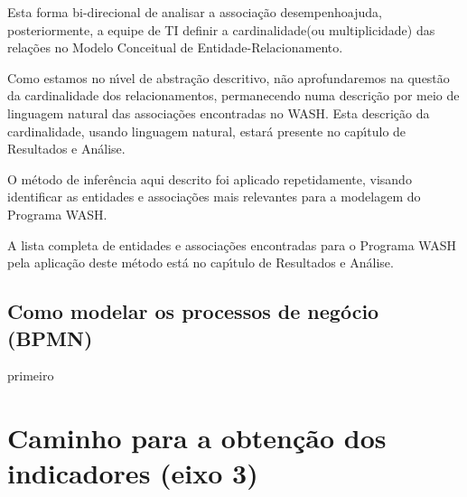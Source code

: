 \documentclass[
12pt,		%
openright,	%
twoside,  %
a4paper,			%
chapter=TITLE,		%
english,			%
french,				%
spanish,			%
brazil				%
]{USPSC-classe/USPSC}
\begin{document}
Esta forma bi-direcional de analisar a associa\c{c}\~ao \textquotedbl desempenho\textquotedbl  ajuda, posteriormente, a equipe de TI definir a \textquotedbl cardinalidade\textquotedbl  (ou multiplicidade) das rela\c{c}\~oes no Modelo Conceitual de Entidade-Relacionamento.









Como estamos no n\'{\i}vel de abstra\c{c}\~ao descritivo, n\~ao aprofundaremos na quest\~ao da cardinalidade dos relacionamentos, permanecendo numa descri\c{c}\~ao por meio de linguagem natural das associa\c{c}\~oes encontradas no WASH. Esta descri\c{c}\~ao da cardinalidade, usando linguagem natural, estar\'a presente no cap\'{\i}tulo de Resultados e An\'alise.









O m\'etodo de infer\^encia aqui descrito foi aplicado repetidamente, visando identificar as entidades e associa\c{c}\~oes mais relevantes para a modelagem do Programa WASH.









A lista completa de entidades e associa\c{c}\~oes encontradas para o Programa WASH pela aplica\c{c}\~ao deste m\'etodo est\'a no cap\'{\i}tulo de Resultados e An\'alise.









\subsection[Como modelar os processos de neg\'ocio (BPMN)]{Como modelar os processos de neg\'ocio (BPMN)}\label{Como modelar os processos de neg\'ocio (BPMN)}
primeiro









\section[Caminho para a obten\c{c}\~ao dos indicadores (eixo 3)]{Caminho para a obten\c{c}\~ao dos indicadores (eixo 3)}\label{Caminho para a obten\c{c}\~ao dos indicadores (eixo 3)}
\end{document}
